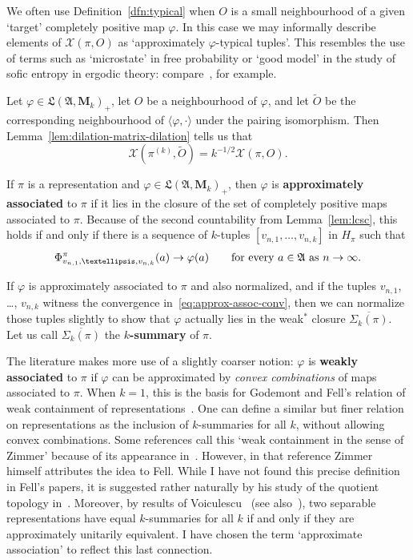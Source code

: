 \documentclass[12pt,a4paper]{article}
\numberwithin{equation}{section}
\theoremstyle{remark}
\newcommand{\rmM}{\mathbf{M}}
\newcommand{\X}{\mathcal{X}}
\newcommand{\A}{\mathfrak{A}}
\newcommand{\frL}{\mathfrak{L}}
\renewcommand{\S}{\Sigma}
\renewcommand{\phi}{\varphi}
\newcommand{\ol}[1]{\overline{#1}}
\renewcommand{\t}[1]{\widetilde{#1}}
\begin{document}
We often use Definition~\ref{dfn:typical} when $O$ is a small neighbourhood of a given `target' completely positive map $\phi$.  In this case we may informally describe elements of $\X(\pi,O)$ as `approximately $\phi$-typical tuples'.  This resembles the use of terms such as `microstate' in free probability or `good model' in the study of sofic entropy in ergodic theory: compare~\cite[Sec. 2.3]{Bowen--survey}, for example.

Let $\phi \in \frL(\A,\rmM_k)_+$, let $O$ be a neighbourhood of $\phi$, and let $\t{O}$ be the corresponding neighbourhood of $\langle \phi,\cdot\rangle$ under the pairing isomorphism.  Then Lemma~\ref{lem:dilation-matrix-dilation} tells us that
\begin{equation}\label{eq:X-and-X}
	\X(\pi^{(k)},\t{O}) = k^{-1/2}\X(\pi,O).
\end{equation}

If $\pi$ is a representation and $\phi \in \frL(\A,\rmM_k)_+$, then $\phi$ is \textbf{approximately associated} to $\pi$ if it lies in the closure of the set of completely positive maps associated to $\pi$. Because of the second countability from Lemma~\ref{lem:lcsc}, this holds if and only if there is a sequence of $k$-tuples $[v_{n,1}, \dots, v_{n,k}]$ in $H_\pi$ such that
\begin{equation}\label{eq:approx-assoc-conv}
\Phi^\pi_{v_{n,1},\dots,v_{n,k}}(a) \to \phi(a) \qquad \hbox{for every}\ a\in \A\ \hbox{as}\ n\to\infty.
\end{equation}

If $\phi$ is approximately associated to $\pi$ and also normalized, and if the tuples $v_{n,1}$, \dots, $v_{n,k}$ witness the convergence in~\eqref{eq:approx-assoc-conv}, then we can normalize those tuples slightly to show that $\phi$ actually lies in the weak$^\ast$ closure $\ol{\S_k(\pi)}$. Let us call $\ol{\S_k(\pi)}$ the \textbf{$k$-summary} of $\pi$.

The literature makes more use of a slightly coarser notion: $\phi$ is \textbf{weakly associated} to $\pi$ if $\phi$ can be approximated by \emph{convex combinations} of maps associated to $\pi$.  When $k=1$, this is the basis for Godemont and Fell's relation of weak containment of representations~\cite[Sec. 3.4]{Dix--Cstar}.  One can define a similar but finer relation on representations as the inclusion of $k$-summaries for all $k$, without allowing convex combinations.  Some references call this `weak containment in the sense of Zimmer' because of its appearance in~\cite[Def. 7.3.5]{Zim84}.  However, in that reference Zimmer himself attributes the idea to Fell.  While I have not found this precise definition in Fell's papers, it is suggested rather naturally by his study of the quotient topology in~\cite{Fel60b,Fel62}.  Moreover, by results of Voiculescu~\cite{Voi76} (see also~\cite{Arv77}),  two separable representations have equal $k$-summaries for all $k$ if and only if they are approximately unitarily equivalent.  I have chosen the term `approximate association' to reflect this last connection. 
\end{document}
